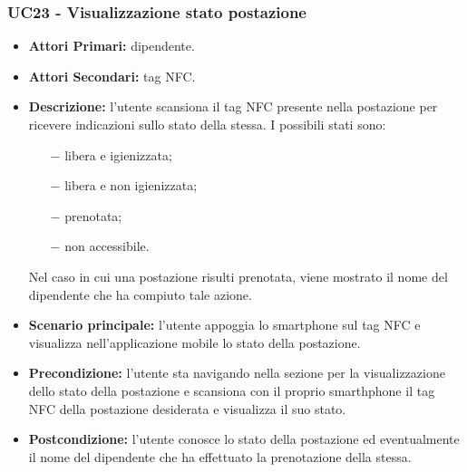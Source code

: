 \subsubsection{ UC23 - Visualizzazione stato postazione}
\begin{itemize}
	\item\textbf{Attori Primari:} dipendente.
	\item\textbf{Attori Secondari:} tag NFC.
	\item\textbf{Descrizione:} l’utente scansiona il tag NFC presente nella postazione per ricevere indicazioni sullo stato della stessa. I possibili stati sono:
	\begin{itemize}
		\item[$-$]libera e igienizzata;
		\item[$-$]libera e non igienizzata;
		\item[$-$]prenotata;
		\item[$-$]non accessibile.
	\end{itemize}
	Nel caso in cui una postazione risulti prenotata, viene mostrato il nome del dipendente che ha compiuto tale azione.
	\item\textbf{Scenario principale:} l’utente appoggia lo smartphone sul tag NFC e visualizza nell'applicazione mobile lo stato della postazione. 
	\item\textbf{Precondizione:} l’utente sta navigando nella sezione per la visualizzazione dello stato della postazione e 
	scansiona con il proprio smarthphone il tag NFC della postazione desiderata e visualizza il suo stato.
	\item\textbf{Postcondizione:} l’utente conosce lo stato della postazione ed eventualmente il nome del dipendente che ha effettuato la prenotazione della stessa.
\end{itemize}

